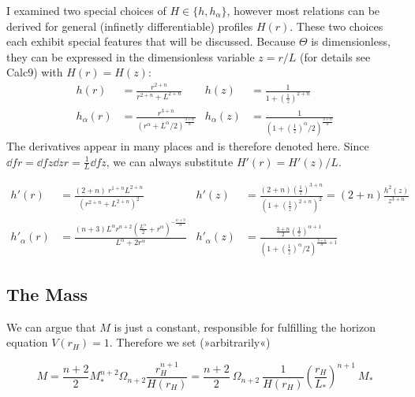 \documentclass[10pt,a4paper, fleqn]{article}
\begin{document}
I examined two special choices of $H \in \{ h, h_\alpha \}$, however most relations can be derived for general (infinetly differentiable) profiles $H(r)$. These two choices each exhibit special features that will be discussed. Because $\Theta$ is dimensionless, they can be expressed in the dimensionless variable $z=r/L$ (for details see Calc9) with $H(r)=H(z)$:
%
\begin{subequations}
\begin{align}
h(r) &= \frac{r^{2+n}}{r^{2+n} + L^{2+n}} \label{eq:holo} 
&h(z) &= \frac 1{1+\left( \frac 1z \right)^{2+n}}
\\
h_\alpha(r) &= \frac{r^{3+n}}{(r^\alpha + L^\alpha/2)^{\frac{3+n}{\alpha}}} \label{eq:selfreg}
&h_\alpha(z) &= \frac{1}{\left(1+\left(\frac 1z\right)^\alpha / 2\right)^{\frac {3+n}{\alpha}}}
\end{align}
\end{subequations}
%
\newpage
The derivatives appear in many places and is therefore denoted here. Since $\dd fr = \dd fz \dd zr = \frac 1L \dd fz$, we can always substitute $H'(r) = H'(z) / L$.

\begin{subequations}
\begin{align}
h'(r) &= \frac{(2+n)~ r^{1+n} L^{2+n}}{(r^{2+n} + L^{2+n})^2}
&h'(z) &= \frac {(2+n) \left( \frac 1z \right)^{3+n}}
{\left( 1 + \left( \frac 1z \right)^{2+n} \right)^2}
= (2+n) \frac{h^2(z)}{z^{3+n}}
 \\
h'_\alpha(r) &= \frac{(n+3) L^{\alpha } r^{n+2}
   \left(\frac{L^{\alpha
   }}{2}+r^{\alpha
   }\right)^{-\frac{n+3}{\alpha
   }}}{L^{\alpha }+2 r^{\alpha
   }}
&h'_\alpha(z) &= \frac{ \frac {3+n}{2} \left( \frac 1z \right)^{\alpha+1}} {\left(1+\left(\frac 1z\right)^\alpha / 2\right)^{\frac {3+n}{\alpha} + 1}}
\end{align}
\end{subequations}

\subsection{The Mass}
We can argue that $M$ is just a constant, responsible for fulfilling the horizon equation $V(r_H)=1$. Therefore we set (»arbitrarily«)

\begin{equation}
M = \frac{n+2}{2} M_*^{n+2} \Omega_{n+2} \frac{r_H^{n+1}}{H(r_H)} 
= \frac{n+2}{2} ~\Omega_{n+2}~ \frac{1}{H(r_H)} \left( \frac{r_H}{L_*} \right)^{n+1} ~M_*
 \label{eq:M}
\end{equation}
\end{document}
